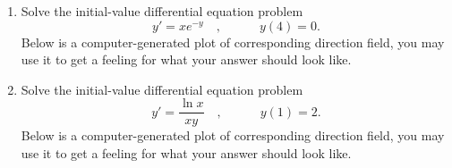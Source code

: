 \begin{enumerate}
\item Solve the initial-value differential equation problem 
\[
y'=xe^{-y} 
\quad,\quad  \quad \quad y(4)=0.
\]
Below is a computer-generated plot of corresponding direction field, you may use it to get a feeling for what your answer should look like.

\item Solve the initial-value differential equation problem 
\[
y'=\frac{\ln x}{x y}
\quad,\quad  \quad \quad y(1)=2.
\]
Below is a computer-generated plot of corresponding direction field, you may use it to get a feeling for what your answer should look like.

\end{enumerate}